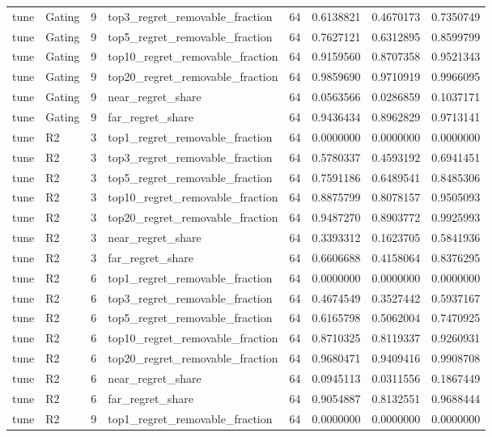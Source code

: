 \begin{tabular}{llrlrrrr}
tune & Gating & 9 & top3_regret_removable_fraction & 64 & 0.6138821 & 0.4670173 & 0.7350749 \\
tune & Gating & 9 & top5_regret_removable_fraction & 64 & 0.7627121 & 0.6312895 & 0.8599799 \\
tune & Gating & 9 & top10_regret_removable_fraction & 64 & 0.9159560 & 0.8707358 & 0.9521343 \\
tune & Gating & 9 & top20_regret_removable_fraction & 64 & 0.9859690 & 0.9710919 & 0.9966095 \\
tune & Gating & 9 & near_regret_share & 64 & 0.0563566 & 0.0286859 & 0.1037171 \\
tune & Gating & 9 & far_regret_share & 64 & 0.9436434 & 0.8962829 & 0.9713141 \\
tune & R2 & 3 & top1_regret_removable_fraction & 64 & 0.0000000 & 0.0000000 & 0.0000000 \\
tune & R2 & 3 & top3_regret_removable_fraction & 64 & 0.5780337 & 0.4593192 & 0.6941451 \\
tune & R2 & 3 & top5_regret_removable_fraction & 64 & 0.7591186 & 0.6489541 & 0.8485306 \\
tune & R2 & 3 & top10_regret_removable_fraction & 64 & 0.8875799 & 0.8078157 & 0.9505093 \\
tune & R2 & 3 & top20_regret_removable_fraction & 64 & 0.9487270 & 0.8903772 & 0.9925993 \\
tune & R2 & 3 & near_regret_share & 64 & 0.3393312 & 0.1623705 & 0.5841936 \\
tune & R2 & 3 & far_regret_share & 64 & 0.6606688 & 0.4158064 & 0.8376295 \\
tune & R2 & 6 & top1_regret_removable_fraction & 64 & 0.0000000 & 0.0000000 & 0.0000000 \\
tune & R2 & 6 & top3_regret_removable_fraction & 64 & 0.4674549 & 0.3527442 & 0.5937167 \\
tune & R2 & 6 & top5_regret_removable_fraction & 64 & 0.6165798 & 0.5062004 & 0.7470925 \\
tune & R2 & 6 & top10_regret_removable_fraction & 64 & 0.8710325 & 0.8119337 & 0.9260931 \\
tune & R2 & 6 & top20_regret_removable_fraction & 64 & 0.9680471 & 0.9409416 & 0.9908708 \\
tune & R2 & 6 & near_regret_share & 64 & 0.0945113 & 0.0311556 & 0.1867449 \\
tune & R2 & 6 & far_regret_share & 64 & 0.9054887 & 0.8132551 & 0.9688444 \\
tune & R2 & 9 & top1_regret_removable_fraction & 64 & 0.0000000 & 0.0000000 & 0.0000000 \\

\end{tabular}
